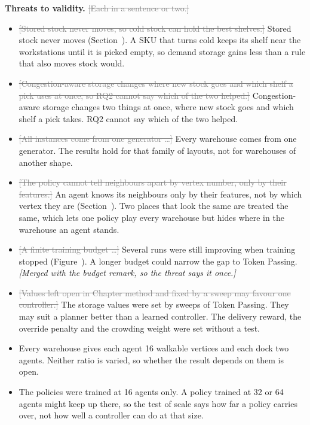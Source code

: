 \documentclass[11pt,a4paper]{article}
\newcommand{\new}[1]{\textcolor{newc}{#1}}
\newcommand{\old}[1]{\textcolor{gray}{\sout{#1}}}
\newcommand{\note}[1]{{\small\itshape [#1]}}
\newcommand{\lab}[1]{\textsf{\footnotesize\detokenize{#1}}}
\renewcommand{\ref}[1]{\lab{#1}}
\begin{document}
\textbf{Threats to validity.} \old{[Each in a sentence or two.]}
\begin{itemize}
  \item \old{[Stored stock never moves, so cold stock can hold the best shelves.]}
    \new{Stored stock never moves (Section~\ref{sec:pf:scope}). A SKU that
    turns cold keeps its shelf near the workstations until it is picked
    empty, so demand storage gains less than a rule that also moves stock
    would.}
  \item \old{[Congestion-aware storage changes where new stock goes and which
    shelf a pick uses at once, so RQ2 cannot say which of the two helped.]}
    \new{Congestion-aware storage changes two things at once, where new stock
    goes and which shelf a pick takes. RQ2 cannot say which of the two
    helped.}
  \item \old{[All instances come from one generator \ldots]}
    \new{Every warehouse comes from one generator. The results hold for that
    family of layouts, not for warehouses of another shape.}
  \item \old{[The policy cannot tell neighbours apart by vertex number, only
    by their features.]}
    \new{An agent knows its neighbours only by their features, not by which
    vertex they are (Section~\ref{sec:method:model}). Two places that look
    the same are treated the same, which lets one policy play every
    warehouse but hides where in the warehouse an agent stands.}
  \item \old{[A finite training budget \ldots]}
    \new{Several runs were still improving when training stopped
    (Figure~\ref{fig:exp:learning}). A longer budget could narrow the gap to
    Token Passing.} \note{Merged with the budget remark, so the threat says
    it once.}
  \item \old{[Values left open in Chapter method and fixed by a sweep may
    favour one controller.]}
    \new{The storage values were set by sweeps of Token Passing. They may
    suit a planner better than a learned controller. The delivery reward,
    the override penalty and the crowding weight were set without a test.}
  \item \new{Every warehouse gives each agent 16 walkable vertices and each
    dock two agents. Neither ratio is varied, so whether the result depends
    on them is open.}
  \item \new{The policies were trained at 16 agents only. A policy trained at
    32 or 64 agents might keep up there, so the test of scale says how far a
    policy carries over, not how well a controller can do at that size.}
\end{itemize}
\end{document}
